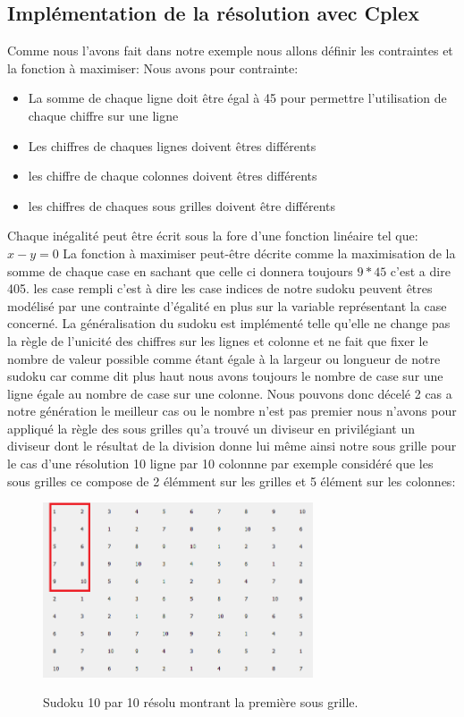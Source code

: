 \subsection{Implémentation de la résolution avec Cplex}

Comme nous l'avons fait dans notre exemple nous allons définir les contraintes et la fonction à maximiser:
Nous avons pour contrainte:
\begin{itemize}
\item La somme de chaque ligne doit être égal à 45 pour permettre l'utilisation de chaque chiffre sur une ligne
\item Les chiffres de chaques lignes doivent êtres différents
\item les chiffre de chaque colonnes doivent êtres différents
\item les chiffres de chaques sous grilles doivent être différents
\end{itemize}
\newline
Chaque inégalité peut être écrit sous la fore d'une fonction linéaire tel que:
\newline
$x-y=0$
\newline
La fonction à maximiser peut-être décrite comme la maximisation de la somme de chaque case en sachant que celle ci donnera toujours $9*45$ c'est a dire 405.
\newline
les case rempli c'est à dire les case indices de notre sudoku peuvent êtres modélisé par une contrainte d'égalité en plus sur la variable représentant la case concerné.\newline
La généralisation du sudoku est implémenté telle qu'elle ne change pas la règle de l'unicité des chiffres sur les lignes et colonne et ne fait que fixer le nombre de valeur possible comme étant égale à la largeur ou longueur de notre sudoku car comme dit plus haut nous avons toujours le nombre de case sur une ligne égale au nombre de case sur une colonne. Nous pouvons donc décelé 2 cas a notre génération le meilleur cas ou le nombre n'est pas premier nous n'avons pour appliqué la règle des sous grilles qu'a trouvé un diviseur en privilégiant un diviseur dont le résultat de la division donne lui même ainsi notre sous grille pour le cas d'une résolution 10 ligne par 10 colonnne par exemple considéré que les sous grilles ce compose de 2 élémment sur les grilles et 5 élément sur les colonnes:

\begin{figure}[h]
  \begin{center}
\includegraphics[width=8cm]{./images/10_10.png}\label{10_10}
\caption{Sudoku 10 par 10 résolu montrant la première sous grille.}
\end{center}
\end{figure}

